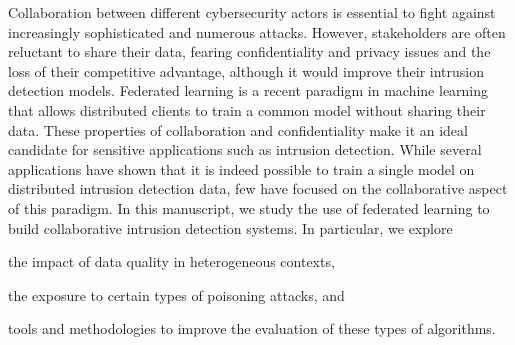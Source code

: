 Collaboration between different cybersecurity actors is essential to fight against increasingly sophisticated and numerous attacks.
However, stakeholders are often reluctant to share their data, fearing confidentiality and privacy issues and the loss of their competitive advantage, although it would improve their intrusion detection models.
Federated learning is a recent paradigm in machine learning that allows distributed clients to train a common model without sharing their data.
These properties of collaboration and confidentiality make it an ideal candidate for sensitive applications such as intrusion detection.
While several applications have shown that it is indeed possible to train a single model on distributed intrusion detection data, few have focused on the collaborative aspect of this paradigm.
%
In this manuscript, we study the use of federated learning to build collaborative intrusion detection systems.
In particular, we explore
\begin{enumerate*}[label={\small(\roman*)}]
  \item the impact of data quality in heterogeneous contexts,
  \item the exposure to certain types of poisoning attacks, and
  \item tools and methodologies to improve the evaluation of these types of algorithms.
\end{enumerate*}